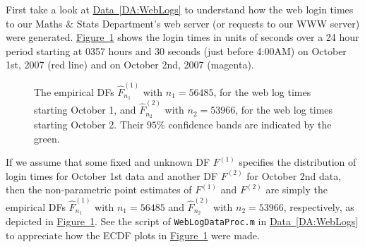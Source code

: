\begin{example}
First take a look at \hyperref[DA:WebLogs]{Data~\ref*{DA:WebLogs}} to understand how the web login times to our Maths \& Stats Department's web server (or requests to our WWW server) were generated. \hyperref[F:WebLogTimesECDFs]{Figure~\ref*{F:WebLogTimesECDFs}} shows the login times in units of seconds over a 24 hour period starting at 0357 hours and 30 seconds (just before 4:00AM) on October 1st, 2007 (red line) and on October 2nd, 2007 (magenta). 
\begin{figure}[htpb]
\caption{The empirical DFs $\widehat{F}^{(1)}_{n_1}$ with $n_1= 56485$, for the web log times starting October 1, and $\widehat{F}^{(2)}_{n_2}$ with $n_2=53966 $, for the web log times starting October 2.  Their $95\%$ confidence bands are indicated by the green.  \label{F:WebLogTimesECDFs}}
\centering   {}
\end{figure}
If we assume that some fixed and unknown DF $F^{(1)}$ specifies the distribution of login times for October 1st data and another DF $F^{(2)}$ for October 2nd data, then the non-parametric point estimates of  $F^{(1)}$ and $F^{(2)}$ are simply the empirical DFs $\widehat{F}^{(1)}_{n_1}$ with $n_1= 56485$ and $\widehat{F}^{(2)}_{n_2}$ with $n_2=53966 $, respectively, as depicted in  \hyperref[F:WebLogTimesECDFs]{Figure~\ref*{F:WebLogTimesECDFs}}.  See the script of {\tt WebLogDataProc.m} in \hyperref[DA:WebLogs]{Data~\ref*{DA:WebLogs}} to appreciate how the ECDF plots in \hyperref[F:WebLogTimesECDFs]{Figure~\ref*{F:WebLogTimesECDFs}} were made.
\end{example}

